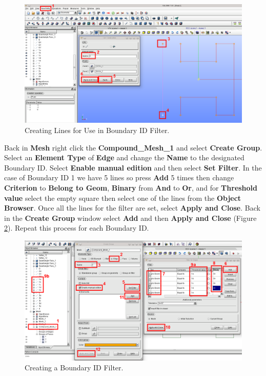 \begin{figure}[h!]
\begin{center}
\includegraphics[scale=0.40]{figures/SalomeStep6.png}
\caption{Creating Lines for Use in Boundary ID Filter.}
\label{fig:no3.2.1.16}
\end{center}
\end{figure}

Back in \textbf{Mesh} right click the \textbf{Compound\_Mesh\_1} and select \textbf{Create Group}.  Select an \textbf{Element Type} of \textbf{Edge} and change the \textbf{Name} to the designated  Boundary ID. Select \textbf{Enable manual edition} and then select \textbf{Set Filter}.  In the case of Boundary ID 1 we have 5 lines so press \textbf{Add} 5 times then change   \textbf{Criterion} to \textbf{Belong to Geom}, \textbf{Binary} from \textbf{And} to \textbf{Or},  and for \textbf{Threshold value} select the empty square then select one of the lines from the  \textbf{Object Browser}. Once all the lines for the filter are set, select \textbf{Apply and Close}. Back in the \textbf{Create Group} window select \textbf{Add} and then \textbf{Apply and Close} (Figure \ref{fig:no3.2.1.17}). Repeat this process for each Boundary ID.
  
\begin{figure}[h!]
\begin{center}
\includegraphics[scale=0.40]{figures/SalomeStep6b.png}
\caption{Creating a Boundary ID Filter.}
\label{fig:no3.2.1.17}
\end{center}
\end{figure}


